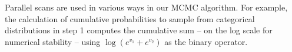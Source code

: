 {Parallel scans are used in various ways in our MCMC algorithm. For example, the calculation of cumulative probabilities to sample from categorical distributions in step 1 computes the cumulative sum -- on the log scale for numerical stability -- using $\log(e^{v_1}+e^{v_2})$ as the binary operator.











}
